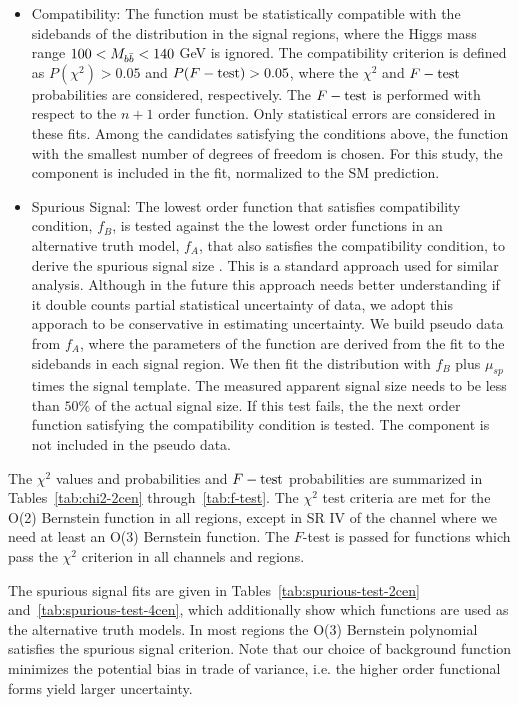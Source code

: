 \begin{itemize}
\item 
Compatibility: The function must be statistically  compatible with the sidebands of the \Mbb{} distribution in the signal regions, where the Higgs mass range $100<M_{b\bar{b}}<140$ GeV is ignored. The compatibility criterion is defined as $P(\chi^2)>0.05$ and $P(F-\rm{test})>0.05$,  where the $\chi^2$ and $F-\rm{test}$ probabilities are considered, respectively. The $F-\rm{test}$ is performed with respect to the $n+1$ order function.  Only statistical errors are considered in these fits.  Among the candidates satisfying the conditions above, the function with the smallest number of degrees of freedom is chosen. For this study, the \zjets{} component is included in the fit,  normalized to the SM prediction.

\item Spurious Signal:  The lowest order function that satisfies compatibility condition, $f_{B}$, is tested against the the lowest order functions in an alternative truth model, $f_{A}$, that also satisfies the compatibility condition, to derive the spurious signal size \cite{CMS-HIG-12-028}. This is a standard approach used for similar analysis. Although in the future this approach needs better understanding if it double counts partial statistical uncertainty of data, we adopt this apporach to be conservative in estimating uncertainty. We build pseudo data from $f_{A}$, where the parameters of the function are derived from the fit to the sidebands in each signal region.  We then fit the distribution with $f_{B}$ plus $\mu_{sp}$ times the signal template. The measured  apparent signal size needs to be less than $50\%$ of the actual signal size. If this test fails, the the next order function satisfying the compatibility condition is tested.  The \zjets{} component is not included in the pseudo data.

\end{itemize}


The $\chi^2$ values and probabilities and $F-\rm{test}$ probabilities are summarized in Tables~\ref{tab:chi2-2cen} through~\ref{tab:f-test}. The $\chi^2$ test criteria are met for the O(2) Bernstein function in all regions, except in 
SR IV of the \fourcentral channel where we need at least an O(3) Bernstein function. The $F$-test is passed for functions which pass the $\chi^2$ criterion in all channels and regions.

The spurious signal fits are given in Tables~\ref{tab:spurious-test-2cen} and~\ref{tab:spurious-test-4cen}, which additionally show which functions are used as the alternative truth models. In most regions the O(3) Bernstein polynomial satisfies the spurious signal criterion. Note that our choice of background function minimizes the potential bias in trade of variance, i.e. the higher order functional forms yield larger uncertainty.

